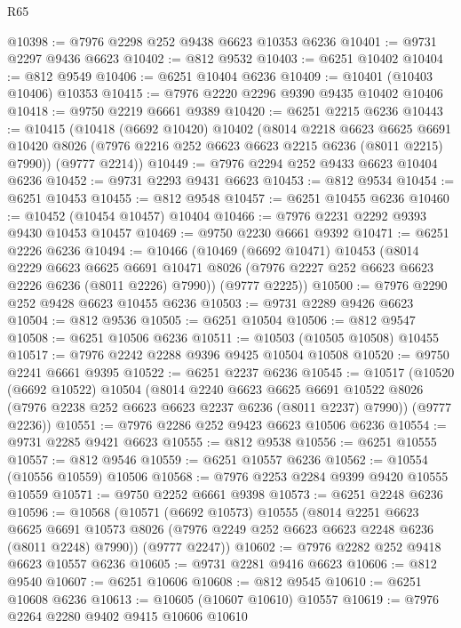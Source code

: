 \begin{lexlean}{R65}
\begin{coremodule}
{@10398 := @7976 @2298 @252 @9438 @6623 @10353 @6236
@10401 := @9731 @2297 @9436 @6623
@10402 := @812 @9532
@10403 := @6251 @10402
@10404 := @812 @9549
@10406 := @6251 @10404 @6236
@10409 := @10401 (@10403 @10406) @10353
@10415 := @7976 @2220 @2296 @9390 @9435 @10402 @10406
@10418 := @9750 @2219 @6661 @9389
@10420 := @6251 @2215 @6236
@10443 := @10415
    (@10418
      (@6692 @10420)
      @10402
      (@8014
        @2218
        @6623
        @6625
        @6691
        @10420
        @8026
        (@7976 @2216 @252 @6623 @6623 @2215 @6236 (@8011 @2215) @7990))
      (@9777 @2214))
@10449 := @7976 @2294 @252 @9433 @6623 @10404 @6236
@10452 := @9731 @2293 @9431 @6623
@10453 := @812 @9534
@10454 := @6251 @10453
@10455 := @812 @9548
@10457 := @6251 @10455 @6236
@10460 := @10452 (@10454 @10457) @10404
@10466 := @7976 @2231 @2292 @9393 @9430 @10453 @10457
@10469 := @9750 @2230 @6661 @9392
@10471 := @6251 @2226 @6236
@10494 := @10466
    (@10469
      (@6692 @10471)
      @10453
      (@8014
        @2229
        @6623
        @6625
        @6691
        @10471
        @8026
        (@7976 @2227 @252 @6623 @6623 @2226 @6236 (@8011 @2226) @7990))
      (@9777 @2225))
@10500 := @7976 @2290 @252 @9428 @6623 @10455 @6236
@10503 := @9731 @2289 @9426 @6623
@10504 := @812 @9536
@10505 := @6251 @10504
@10506 := @812 @9547
@10508 := @6251 @10506 @6236
@10511 := @10503 (@10505 @10508) @10455
@10517 := @7976 @2242 @2288 @9396 @9425 @10504 @10508
@10520 := @9750 @2241 @6661 @9395
@10522 := @6251 @2237 @6236
@10545 := @10517
    (@10520
      (@6692 @10522)
      @10504
      (@8014
        @2240
        @6623
        @6625
        @6691
        @10522
        @8026
        (@7976 @2238 @252 @6623 @6623 @2237 @6236 (@8011 @2237) @7990))
      (@9777 @2236))
@10551 := @7976 @2286 @252 @9423 @6623 @10506 @6236
@10554 := @9731 @2285 @9421 @6623
@10555 := @812 @9538
@10556 := @6251 @10555
@10557 := @812 @9546
@10559 := @6251 @10557 @6236
@10562 := @10554 (@10556 @10559) @10506
@10568 := @7976 @2253 @2284 @9399 @9420 @10555 @10559
@10571 := @9750 @2252 @6661 @9398
@10573 := @6251 @2248 @6236
@10596 := @10568
    (@10571
      (@6692 @10573)
      @10555
      (@8014
        @2251
        @6623
        @6625
        @6691
        @10573
        @8026
        (@7976 @2249 @252 @6623 @6623 @2248 @6236 (@8011 @2248) @7990))
      (@9777 @2247))
@10602 := @7976 @2282 @252 @9418 @6623 @10557 @6236
@10605 := @9731 @2281 @9416 @6623
@10606 := @812 @9540
@10607 := @6251 @10606
@10608 := @812 @9545
@10610 := @6251 @10608 @6236
@10613 := @10605 (@10607 @10610) @10557
@10619 := @7976 @2264 @2280 @9402 @9415 @10606 @10610
}
\end{coremodule}
\end{lexlean}
